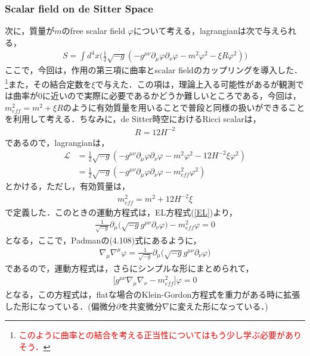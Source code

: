 \subsubsection{Scalar field on de Sitter Space}
次に，質量が$m$のfree scalar field $\varphi$について考える，lagrangianは次で与えられる，
\begin{align}
S=\int d^4x\biggr(\frac{1}{2}\sqrt{-g}(-g^{\mu\nu}\partial_{\mu}\varphi\partial_{\nu}\varphi-m^2\varphi^2-\xi R \varphi^2)\biggl)
\end{align}
ここで，今回は，作用の第三項に曲率とscalar fieldのカップリングを導入した．\footnote{\textcolor{red}{このように曲率との結合を考える正当性についてはもう少し学ぶ必要がありそう．}}また，その結合定数を$\xi$で与えた．この項は，理論上入る可能性があるが観測では曲率が0に近いので実際に必要であるかどうか難しいところである，今回は，$m_{eff}^2=m^2+\xi R$のように有効質量を用いることで普段と同様の扱いができることを利用して考える．ちなみに，de Sitter時空におけるRicci scalarは，
\begin{align}
  R=12H^{-2}
\end{align}
であるので，lagrangianは，
\begin{align}
  \label{1.60}
  \mathcal{L}&=\frac{1}{2}\sqrt{-g}(-g^{\mu\nu}\partial_{\mu}\varphi\partial_{\nu}\varphi-m^2\varphi^2-12H^{-2}\xi \varphi^2) \\
  \label{1.61}
  &=\frac{1}{2}\sqrt{-g}(-g^{\mu\nu}\partial_{\mu}\varphi\partial_{\nu}\varphi-m_{eff}^2\varphi^2)
\end{align}
とかける，ただし，有効質量は，
\begin{align}
  m_{eff}^2=m^2+12H^{-2}\xi
\end{align}
で定義した．このときの運動方程式は，EL方程式(\ref{EL})より，
\begin{align}
    \frac{1}{\sqrt{-g}}\partial_{\mu}\biggl(\sqrt{-g}g^{\mu\nu}\partial_{\nu}\varphi
\biggr)
    -m_{eff}^2\varphi=0
\end{align}
となる，ここで，Padmanの(4.108)式にあるように，
\begin{align}
  \label{1.65}
  \nabla_{\mu}\nabla^{\mu}\varphi=\frac{1}{\sqrt{-g}}\partial_{\mu}\biggl(\sqrt{-g}g^{\mu\nu}\partial_{\nu}\varphi\biggr)
\end{align}
であるので，運動方程式は，さらにシンプルな形にまとめられて，
\begin{align}
  \label{1.66}
  \biggl[g^{\mu\nu}\nabla_{\mu}\nabla_{\nu}-m_{eff}^2\biggr]\varphi=0
\end{align}
となる，この方程式は，flatな場合のKlein-Gordon方程式を重力がある時に拡張した形になっている．(偏微分$\partial$を共変微分$\nabla$に変えた形になっている．)
